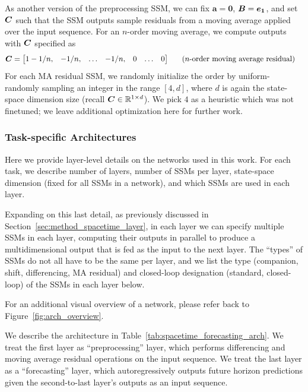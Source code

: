 As another version of the preprocessing SSM, we can fix $\boldsymbol{a} = \boldsymbol{0}$, $\boldsymbol{B} = \boldsymbol{e_1}$, and set $\boldsymbol{C}$ such that the SSM outputs sample residuals from a moving average applied over the input sequence. For an $n$-order moving average, we compute outputs with $\boldsymbol{C}$ specified as
\begin{align}
    \zC &= 
    \begin{bmatrix}
    1 - 1/n, & -1/n, & \ldots & -1/n, & 0 & \ldots & 0 \\
    \end{bmatrix}
    \;\;\;\;\;\;
    \begin{matrix}
    \hfill\text{($n$-order moving average residual)} \\
    \end{matrix}
\end{align}
For each MA residual SSM, we randomly initialize the order by uniform-randomly sampling an integer in the range $[4, d]$, where $d$ is again the state-space dimension size (recall $\boldsymbol{C} \in \mathbb{R}^{1 \times d}$). We pick $4$ as a heuristic which was not finetuned; we leave additional optimization here for further work.

\subsubsection{Task-specific \ourmethod{} Architectures}\label{appendix:specific_spacetime_architectures}

Here we provide layer-level details on the \ourmethod{} networks used in this work. For each task, we describe number of layers, number of SSMs per layer, state-space dimension (fixed for all SSMs in a network), and which SSMs are used in each layer. 

Expanding on this last detail, as previously discussed in Section~\ref{sec:method_spacetime_layer}, in each \ourmethod{} layer we can specify multiple SSMs in each layer, computing their outputs in parallel to produce a multidimensional output that is fed as the input to the next \ourmethod{} layer. The ``types'' of SSMs do not all have to be the same per layer, and we list the type (companion, shift, differencing, MA residual) and closed-loop designation (standard, closed-loop) of the SSMs in each layer below.

For an additional visual overview of a \ourmethod{} network, please refer back to Figure~\ref{fig:arch_overview}.

We describe the architecture in Table~\ref{tab:spacetime_forecasting_arch}. We treat the first \ourmethod{} layer as ``preprocessing'' layer, which performs differencing and moving average residual operations on the input sequence. We treat the last \ourmethod{} layer as a ``forecasting'' layer, which autoregressively outputs future horizon predictions given the second-to-last layer's outputs as an input sequence.

